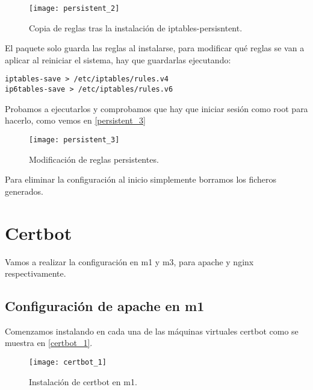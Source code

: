 \begin{figure}[h!]
\begin{center}
\caption{Copia de reglas tras la instalación de iptables-persisntent.}
\label{persistent_2}
\texttt{[image: persistent\_2]}
\end{center}
\end{figure}

El paquete solo guarda las reglas al instalarse, para modificar qué reglas se van a aplicar al reiniciar el sistema, hay que guardarlas ejecutando:

\begin{verbatim}
iptables-save > /etc/iptables/rules.v4
ip6tables-save > /etc/iptables/rules.v6
\end{verbatim}

Probamos a ejecutarlos y comprobamos que hay que iniciar sesión como root para hacerlo, como vemos en \eqref{persistent_3}

\begin{figure}[h!]
\begin{center}
\caption{Modificación de reglas persistentes.}
\label{persistent_3}
\texttt{[image: persistent\_3]}
\end{center}
\end{figure}

Para eliminar la configuración al inicio simplemente borramos los ficheros generados.








\chapter{Certbot}

Vamos a realizar la configuración en m1 y m3, para apache y nginx respectivamente.

\section{Configuración de apache en m1}

Comenzamos instalando en cada una de las máquinas virtuales certbot como se muestra en \eqref{certbot_1}.

\begin{figure}[h!]
\begin{center}
\caption{Instalación de certbot en m1.}
\label{certbot_1}
\texttt{[image: certbot\_1]}
\end{center}
\end{figure}


